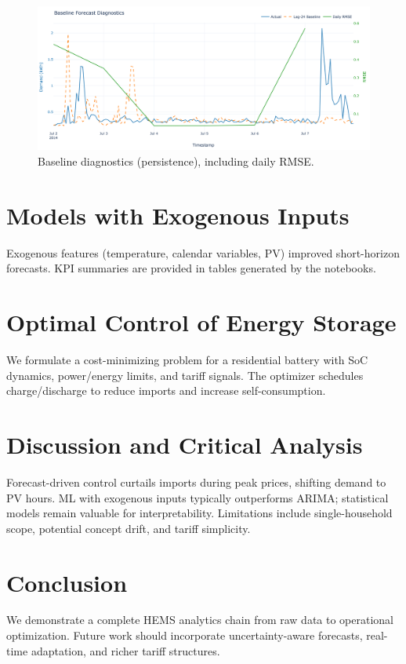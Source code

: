 \documentclass[12pt,a4paper]{article}
\begin{document}
\begin{figure}[H]
  \centering
  \includegraphics[width=\linewidth]{06_baseline_diagnostics.png}
  \caption{Baseline diagnostics (persistence), including daily RMSE.}
  \label{fig:baseline}
\end{figure}

\section{Models with Exogenous Inputs}
Exogenous features (temperature, calendar variables, PV) improved short-horizon forecasts. KPI summaries are provided in tables generated by the notebooks.

\section{Optimal Control of Energy Storage}
We formulate a cost-minimizing problem for a residential battery with SoC dynamics, power/energy limits, and tariff signals. The optimizer schedules charge/discharge to reduce imports and increase self-consumption.

\section{Discussion and Critical Analysis}
Forecast-driven control curtails imports during peak prices, shifting demand to PV hours. ML with exogenous inputs typically outperforms ARIMA; statistical models remain valuable for interpretability. Limitations include single-household scope, potential concept drift, and tariff simplicity.

\section{Conclusion}
We demonstrate a complete HEMS analytics chain from raw data to operational optimization. Future work should incorporate uncertainty-aware forecasts, real-time adaptation, and richer tariff structures.

\printbibliography
\end{document}
